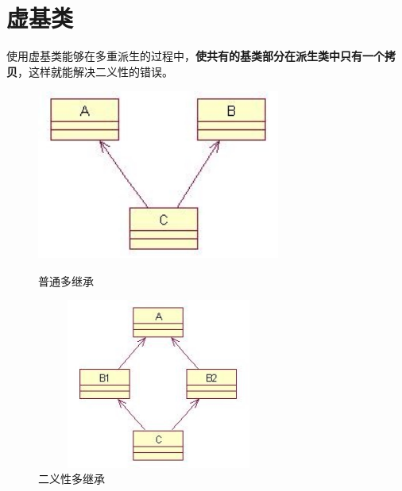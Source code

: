 \documentclass[UTF8,a4paper,12pt]{ctexbook} %
\begin{document}
\section{虚基类}使用虚基类能够在多重派生的过程中，\textbf{使共有的基类部分在派生类中只有一个拷贝}，这样就能解决二义性的错误。
		        \begin{figure}[h]
		        	\begin{center}
		        		\begin{minipage}[H]{0.5\textwidth}
			        			\centering
			        			\includegraphics[angle=0,width=8cm,height=5.6cm]{derive.jpg}%
			        			\caption{普通多继承}
			        			\label{fig:derive}
		        		\end{minipage}%
		        		\begin{minipage}[H]{0.5\textwidth} 
			        			\centering
			        			\includegraphics[angle=0,width=8cm,height=5.6cm]{derive2.jpg}
			        			\caption{二义性多继承}
			        			\label{fig:derive2}
		        		\end{minipage}
		        	\end{center}
		        \end{figure}
        
\end{document}
